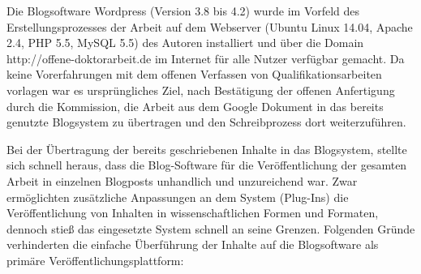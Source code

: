 Die Blogsoftware Wordpress (Version 3.8 bis 4.2) wurde im Vorfeld des Erstellungsprozesses der Arbeit auf dem Webserver (Ubuntu Linux 14.04, Apache 2.4, PHP 5.5, MySQL 5.5) des Autoren installiert und über die Domain http://offene-doktorarbeit.de im Internet für alle Nutzer verfügbar gemacht. Da keine Vorerfahrungen mit dem offenen Verfassen von Qualifikationsarbeiten vorlagen war es ursprüngliches Ziel, nach Bestätigung der offenen Anfertigung durch die Kommission, die Arbeit aus dem Google Dokument in das bereits genutzte Blogsystem zu übertragen und den Schreibprozess dort weiterzuführen.

Bei der Übertragung der bereits geschriebenen Inhalte in das Blogsystem, stellte sich schnell heraus, dass die Blog-Software für die Veröffentlichung der gesamten Arbeit in einzelnen Blogposts unhandlich und unzureichend war. Zwar ermöglichten zusätzliche Anpassungen an dem System (Plug-Ins) die Veröffentlichung von Inhalten in wissenschaftlichen Formen und Formaten, dennoch stieß das eingesetzte System schnell an seine Grenzen. Folgenden Gründe verhinderten die einfache Überführung der Inhalte auf die Blogsoftware als primäre Veröffentlichungsplattform:
